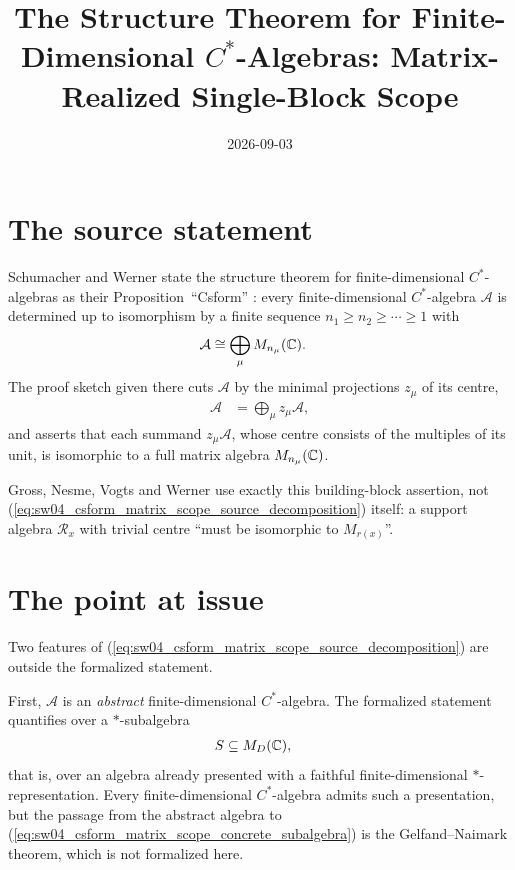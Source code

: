 \documentclass{article}
\title{The Structure Theorem for Finite-Dimensional $C^\ast$-Algebras:
    Matrix-Realized Single-Block Scope}
\author{}
\date{2026-09-03}
\begin{document}
\maketitle
{}

\section{The source statement}

Schumacher and Werner state the structure theorem for finite-dimensional
$C^\ast$-algebras as their Proposition~``Csform''
\cite[lines~2082--2098]{SchumacherWerner2004}: every finite-dimensional
$C^\ast$-algebra $\mathcal A$ is determined up to isomorphism by a finite
sequence $n_1\geq n_2\geq\cdots\geq 1$ with
\begin{align}
    \mathcal A
        &\cong\bigoplus_\mu M_{n_\mu}(\mathbb{C}).
    \label{eq:sw04_csform_matrix_scope_source_decomposition}
\end{align}
The proof sketch given there cuts $\mathcal A$ by the minimal projections
$z_\mu$ of its centre,
\begin{align}
    \mathcal A
        &=\bigoplus_\mu z_\mu\mathcal A,
    \label{eq:sw04_csform_matrix_scope_central_cut}
\end{align}
and asserts that each summand $z_\mu\mathcal A$, whose centre consists of the
multiples of its unit, is isomorphic to a full matrix algebra $M_{n_\mu}(\mathbb{C})$.

Gross, Nesme, Vogts and Werner use exactly this building-block assertion, not
(\ref{eq:sw04_csform_matrix_scope_source_decomposition}) itself: a support
algebra $\mathcal R_x$ with trivial centre ``must be isomorphic to
$M_{r(x)}$''\cite[lines~1278--1282]{GrossNesmeVogtsWerner2012}.

\section{The point at issue}

Two features of
(\ref{eq:sw04_csform_matrix_scope_source_decomposition}) are outside the
formalized statement.

First, $\mathcal A$ is an \emph{abstract} finite-dimensional $C^\ast$-algebra.
The formalized statement quantifies over a $*$-subalgebra
\begin{align}
    S
        &\subseteq M_{D}(\mathbb{C}),
    \label{eq:sw04_csform_matrix_scope_concrete_subalgebra}
\end{align}
that is, over an algebra already presented with a faithful finite-dimensional
$*$-representation. Every finite-dimensional $C^\ast$-algebra admits such a
presentation, but the passage from the abstract algebra to
(\ref{eq:sw04_csform_matrix_scope_concrete_subalgebra}) is the
Gelfand--Naimark theorem, which is not formalized here.
\end{document}
